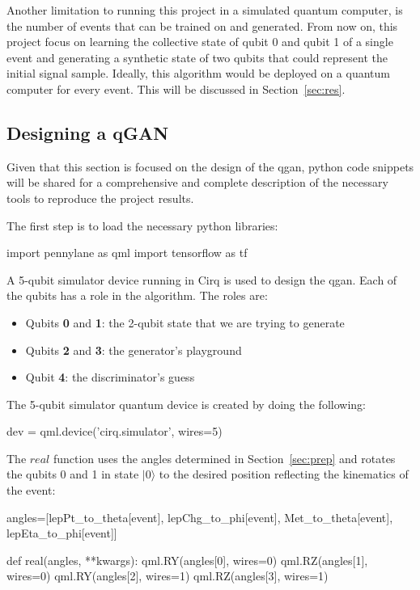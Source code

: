 Another limitation to running this project in a simulated quantum computer, is
the number of events that can be trained on and generated. From now on, this
project focus on learning the collective state of qubit 0 and qubit 1 of a 
single event and generating a synthetic state of two qubits that could represent
the initial signal sample. Ideally, this algorithm would be deployed on a quantum
computer for every event. This will be discussed in Section~\ref{sec:res}.

\subsection{Designing a qGAN}
\label{sec:qgan}

Given that this section is focused on the design of the \gls{qgan}, python code 
snippets will be shared for a comprehensive and complete description of the 
necessary tools to reproduce the project results.

The first step is to load the necessary python libraries:
\begin{python}
import pennylane as qml
import tensorflow as tf
\end{python}

A 5-qubit simulator device running in Cirq is used to design the \gls{qgan}. Each
of the qubits has a role in the algorithm. The roles are:
\begin{itemize}
    \item Qubits \textbf{0} and \textbf{1}: the 2-qubit state that we are trying
    to generate
    \item Qubits \textbf{2} and \textbf{3}: the generator's playground
    \item Qubit \textbf{4}: the discriminator's guess
\end{itemize}

The 5-qubit simulator quantum device is created by doing the following:

\begin{python}
dev = qml.device('cirq.simulator', wires=5)
\end{python}

The $real$ function uses the angles determined in Section~\ref{sec:prep} and 
rotates the qubits 0 and 1 in state $\vert 0 \rangle$ to the desired position 
reflecting the kinematics of the event:
\begin{python}
angles=[lepPt_to_theta[event],
        lepChg_to_phi[event],
        Met_to_theta[event],
        lepEta_to_phi[event]]

def real(angles, **kwargs):
    qml.RY(angles[0], wires=0)
    qml.RZ(angles[1], wires=0)
    qml.RY(angles[2], wires=1)
    qml.RZ(angles[3], wires=1)
\end{python}

